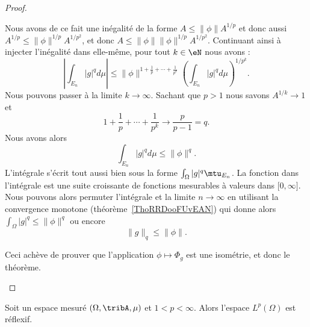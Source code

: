 \begin{proof}
\begin{subproof}
            Nous avons de ce fait une inégalité de la forme \( A\leq \| \phi \|A^{1/p}\) et donc aussi \( A^{1/p}\leq \| \phi \|^{1/p}A^{1/p^2}\), et donc \( A\leq \| \phi \|\| \phi \|^{1/p}A^{1/p^2}\). Continuant ainsi à injecter l'inégalité dans elle-même, pour tout \( k\in \eN\) nous avons :
            \begin{equation}
                \left| \int_{E_n}| g |^qd\mu \right| \leq\| \phi \|^{1+\frac{1}{ p }+\cdots+\frac{1}{ p^k }}\left( \int_{E_n}| g |^qd\mu \right)^{1/p^k}.
            \end{equation}
            Nous pouvons passer à la limite \( k\to \infty\). Sachant que \( p>1\) nous savons \( A^{1/k}\to 1\) et
            \begin{equation}
                1+\frac{1}{ p }+\cdots+\frac{1}{ p^k }\to\frac{ p }{ p-1 }=q.
            \end{equation}
            Nous avons alors
            \begin{equation}
                \int_{E_n}| g |^qd\mu\leq \| \phi \|^q.
            \end{equation}
            L'intégrale s'écrit tout aussi bien sous la forme \( \int_{\Omega}| g  |^q\mtu_{E_n}\). La fonction dans l'intégrale est une suite croissante de fonctions mesurables à valeurs dans \( \mathopen[ 0 , \infty \mathclose]\). Nous pouvons alors permuter l'intégrale et la limite \( n\to \infty\) en utilisant la convergence monotone (théorème~\ref{ThoRRDooFUvEAN}) qui donne alors \( \int_{\Omega}| g |^q\leq \| \phi \|^q\) ou encore
            \begin{equation}
                \| g \|_q\leq \| \phi \|.
            \end{equation}

            Ceci achève de prouver que l'application \( \phi\mapsto \Phi_g\) est une isométrie, et donc le théorème.

    \end{subproof}
\end{proof}

\begin{proposition}     \label{PROPooGIOZooBMokXi}
    Soit un espace mesuré \( (\Omega,\tribA,\mu)\) et \( 1<p<\infty\). Alors l'espace \( L^p(\Omega)\) est réflexif.
\end{proposition}

